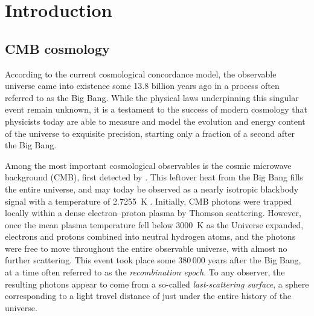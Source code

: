 \documentclass[twocolumn]{aa}
\begin{document}

\maketitle

\tableofcontents


\section{Introduction}
\label{sec:introduction}

\subsection{CMB cosmology}

According to the current cosmological concordance model, the
observable universe came into existence some 13.8 billion years ago in
a process often referred to as the Big Bang. While the physical laws
underpinning this singular event remain unknown, it is a testament to
the success of modern cosmology that physicists today are able to
measure and model the evolution and energy content of the universe to
exquisite precision, starting only a fraction of a second after the
Big Bang.

Among the most important cosmological observables is the cosmic
microwave background (CMB), first detected by \citet{penzias:1965}.
This leftover heat from the Big Bang fills the entire
universe, and may today be observed as a nearly isotropic
blackbody signal with a temperature of 2.7255~K
\citep{fixsen2009}. Initially, CMB photons were
trapped locally within a dense electron--proton plasma by Thomson
scattering. However, once the mean plasma temperature fell below
3000~K as the Universe expanded, electrons and protons combined into neutral hydrogen atoms,
and the photons were free to move throughout the entire observable
universe, with almost no further scattering. This event took place some
380\,000 years after the Big Bang, at a time often referred to as the
\emph{recombination epoch}. To any observer, the
resulting photons appear to come from a so-called
\emph{last-scattering surface}, a sphere corresponding to a light 
travel distance of just under the entire history of the universe.
\end{document}
